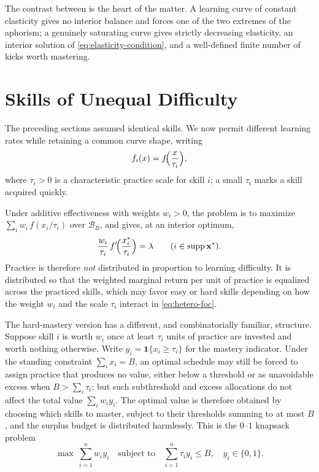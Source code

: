 \documentclass[11pt]{article}
\theoremstyle{definition}
\theoremstyle{remark}
\newcommand{\vx}{\mathbf{x}}
\newcommand{\simplex}{\mathcal{B}}
\newcommand{\supp}{\operatorname{supp}}
\begin{document}
The contrast between  is the
heart of the matter. A learning curve of constant elasticity gives no
interior balance and forces one of the two extremes of the aphorism; a
genuinely saturating curve gives strictly decreasing elasticity, an
interior solution of \eqref{eq:elasticity-condition}, and a well-defined
finite number of kicks worth mastering.


\section{Skills of Unequal Difficulty}
\label{sec:heterogeneous}

The preceding sections assumed identical skills. We now permit different
learning rates while retaining a common curve shape, writing
\begin{equation}
    f_i(x)=f\!\Bigl(\frac{x}{\tau_i}\Bigr),
    \label{eq:hetero-curve}
\end{equation}
where \(\tau_i>0\) is a characteristic practice scale for skill \(i\); a
small \(\tau_i\) marks a skill acquired quickly.

Under additive effectiveness with weights \(w_i>0\), the problem is to
maximize \(\sum_i w_i\,f(x_i/\tau_i)\) over \(\simplex_B\), and
 gives, at an interior optimum,
\begin{equation}
    \frac{w_i}{\tau_i}\,
    f'\!\Bigl(\frac{x_i^*}{\tau_i}\Bigr)
    =\lambda
    \qquad(i\in\supp\vx^*).
    \label{eq:hetero-foc}
\end{equation}
Practice is therefore \emph{not} distributed in proportion to learning
difficulty. It is distributed so that the weighted marginal return per unit
of practice is equalized across the practiced skills, which may favor easy
or hard skills depending on how the weight \(w_i\) and the scale \(\tau_i\)
interact in \eqref{eq:hetero-foc}.

The hard-mastery version has a different, and combinatorially familiar,
structure. Suppose skill \(i\) is worth \(w_i\) once at least \(\tau_i\)
units of practice are invested and worth nothing otherwise. Write
\(y_i=\mathbf{1}\{x_i\geq\tau_i\}\) for the mastery indicator. Under the
standing constraint \(\sum_i x_i=B\), an optimal schedule may still be
forced to assign practice that produces no value, either below a threshold
or as unavoidable excess when \(B>\sum_i\tau_i\); but such subthreshold and
excess allocations do not affect the total value \(\sum_i w_i y_i\). The
optimal value is therefore obtained by choosing which skills to master,
subject to their thresholds summing to at most \(B\), and the surplus budget
is distributed harmlessly. This is the \(0\)--\(1\) knapsack problem
\begin{equation}
    \max\ \sum_{i=1}^n w_i y_i
    \quad\text{subject to}\quad
    \sum_{i=1}^n \tau_i y_i\leq B,
    \quad y_i\in\{0,1\}.
    \label{eq:knapsack}
\end{equation}
\end{document}
